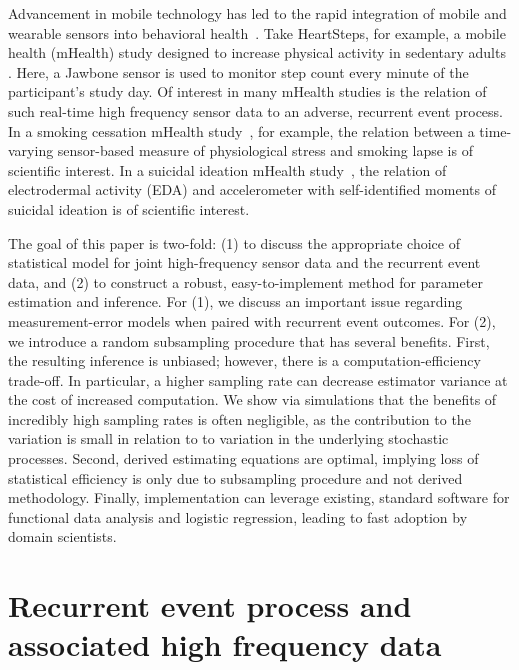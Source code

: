 \documentclass[12pt]{amsart}
\begin{document}
Advancement in mobile technology has led to the rapid integration of
mobile and wearable sensors into behavioral health~\citep{Freeetal2013}.
Take HeartSteps, for example, a mobile health (mHealth) study designed
to increase physical activity in sedentary adults
\citep{KlasnjaHS2019}. Here, a Jawbone sensor is used to monitor step
count every minute of the participant's study day.
Of interest in many mHealth studies is the relation of such
real-time high frequency sensor data to an adverse, recurrent event
process. In a smoking cessation mHealth study~\citep{Sense2Stop}, for
example, the relation between a time-varying sensor-based measure of
physiological stress and smoking lapse is of scientific interest.
In a suicidal ideation mHealth study~\citep{Kleiman2018}, the relation of
electrodermal activity (EDA) and accelerometer with self-identified
moments of suicidal ideation is of scientific interest.


The goal of this paper is two-fold: (1) to discuss the appropriate
choice of statistical model for joint high-frequency sensor data and
the recurrent event data, and (2) to construct a robust,
easy-to-implement method for parameter estimation and inference. 
For (1), we discuss an important issue regarding measurement-error
models when paired with recurrent event outcomes.
For (2), we introduce a random subsampling procedure that has
several benefits.  First, the resulting inference is unbiased;
however, there is a computation-efficiency trade-off. In particular, a
higher sampling rate can decrease estimator variance at the cost of
increased computation.  We show via simulations that the benefits of
incredibly high sampling rates is often negligible, as the
contribution to the variation is small in relation to to variation in
the underlying stochastic processes. Second, derived estimating
equations are optimal, implying loss of statistical efficiency is only
due to subsampling procedure and not derived methodology.  Finally,
implementation can leverage existing, standard software for functional
data analysis and logistic regression, leading to fast adoption by
domain scientists.  

\section{Recurrent event process and associated high frequency data}
\end{document}

